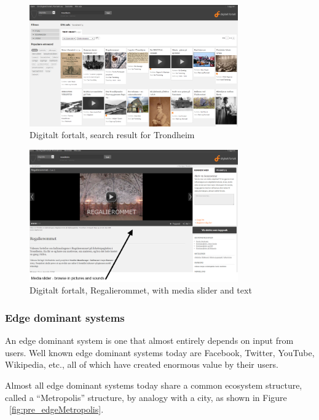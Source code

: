 \documentclass[11pt]{book}
\begin{document}
\begin{figure}[H]
      \centering
      \includegraphics[width=0.8\textwidth]{Figures/Prestudy/digitaltfortaltSokTrondheim.png}
      \caption{ Digitalt fortalt, search result for Trondheim}
      \label{fig:pre_fortaltTrondheim}
\end{figure}

\begin{figure}[H]
      \centering
      \includegraphics[width=0.8\textwidth]{Figures/Prestudy/digitaltfortaltRegalierommet.png}
      \caption{Digitalt fortalt, Regalierommet, with media slider and text}
      \label{fig:pre_fortaltRegalierommet}
\end{figure}

\subsubsection{Edge dominant systems}
An edge dominant system is one that almost entirely depends on input from users. Well known edge dominant systems today are Facebook, Twitter, YouTube, Wikipedia, etc., all of which have created enormous value by their users. 

Almost all edge dominant systems today share a common ecosystem structure, called a “Metropolis” structure, by analogy with a city, as shown in Figure ~\ref{fig:pre_edgeMetropolis}.
\end{document}
